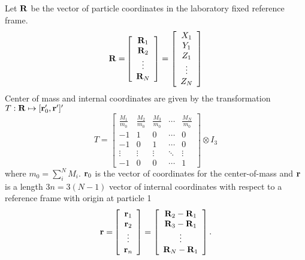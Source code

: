 Let ${\bf R}$ be the vector of particle coordinates in the laboratory fixed
reference frame. 
\begin{equation}
{\bf R=}\left[ 
\begin{array}{c}
{\bf R}_1 \\ 
{\bf R}_2 \\ 
\vdots \\ 
{\bf R}_N
\end{array}
\right] =\left[ 
\begin{array}{c}
X_1 \\ 
Y_1 \\ 
Z_1 \\ 
\vdots \\ 
Z_N
\end{array}
\right]
\end{equation}
Center of mass and internal coordinates are given by the transformation $T:%
{\bf R}\mapsto [{\bf r}_0^{\prime },{\bf r}^{\prime }]^{\prime }$ 
\begin{equation}
T=\left[ 
\begin{array}{ccccc}
\frac{M_1}{m_0} & \frac{M_2}{m_0} & \frac{M_3}{m_0} & \cdots & \frac{M_N}{m_0%
} \\ 
-1 & 1 & 0 & \cdots & 0 \\ 
-1 & 0 & 1 & \cdots & 0 \\ 
\vdots & \vdots & \vdots & \ddots & \vdots \\ 
-1 & 0 & 0 & \cdots & 1
\end{array}
\right] \otimes I_3  \label{Ttran}
\end{equation}
where $m_0=\sum_i^NM_i$. ${\bf r}_0$ is the vector of coordinates for the
center-of-mass and ${\bf r}$ is a length $3n=3\left( N-1\right) $ vector of
internal coordinates with respect to a reference frame with origin at
particle 1 
\begin{equation}
{\bf r=}\left[ 
\begin{array}{c}
{\bf r}_1 \\ 
{\bf r}_2 \\ 
\vdots \\ 
{\bf r}_n
\end{array}
\right] =\left[ 
\begin{array}{c}
{\bf R}_2-{\bf R}_1 \\ 
{\bf R}_3-{\bf R}_1 \\ 
\vdots \\ 
{\bf R}_N-{\bf R}_1
\end{array}
\right] .  \label{rdef}
\end{equation}
